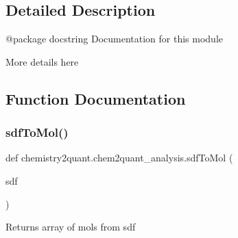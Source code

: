 \subsection{Detailed Description}
\begin{DoxyVerb}@package docstring
Documentation for this module

More details here \end{DoxyVerb}


\subsection{Function Documentation}
\mbox{\label{namespacechemistry2quant_1_1chem2quant__analysis_a5c890927e4c20980765efaff0db0c04a}}
\subsubsection{\texorpdfstring{sdf\+To\+Mol()}{sdfToMol()}}
{\footnotesize\ttfamily def chemistry2quant.\+chem2quant\+\_\+analysis.\+sdf\+To\+Mol (\begin{DoxyParamCaption}\item[{}]{sdf }\end{DoxyParamCaption})}

\begin{DoxyVerb}Returns array of mols from sdf
\end{DoxyVerb}
